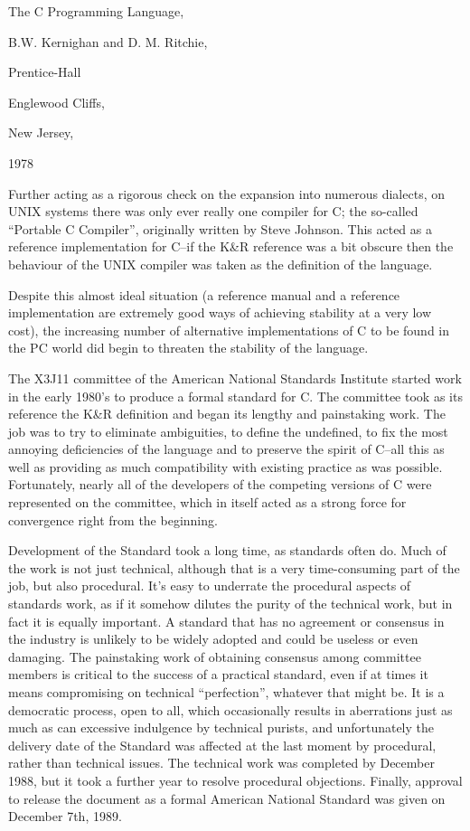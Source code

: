   

   The C Programming Language,

   B.W. Kernighan and D. M. Ritchie,

   Prentice-Hall

   Englewood Cliffs,

   New Jersey,

   1978

  


  Further acting as a rigorous check on the expansion into numerous
   dialects, on UNIX systems there was only ever really one compiler for C;
   the so-called ``Portable C Compiler'', originally written by
   Steve Johnson. This acted as a reference implementation for C--if
   the K\&R reference was a bit obscure then the behaviour of the UNIX
   compiler was taken as the definition of the language.


  Despite this almost ideal situation (a reference manual and a reference
   implementation are extremely good ways of achieving stability at a very low
   cost), the increasing number of alternative implementations of C to be
   found in the PC world did begin to threaten the stability of the
   language.


  The X3J11 committee of the American National Standards Institute started
   work in the early 1980's to produce a formal standard for C. The committee
   took as its reference the K\&R definition and began its lengthy and
   painstaking work. The job was to try to eliminate ambiguities, to define
   the undefined, to fix the most annoying deficiencies of the language and to
   preserve the spirit of C--all this as well as providing as much
   compatibility with existing practice as was possible. Fortunately, nearly
   all of the developers of the competing versions of C were represented on
   the committee, which in itself acted as a strong force for convergence
   right from the beginning.


  Development of the Standard took a long time, as standards often do. Much
   of the work is not just technical, although that is a very time-consuming
   part of the job, but also procedural. It's easy to underrate the procedural
   aspects of standards work, as if it somehow dilutes the purity of the
   technical work, but in fact it is equally important. A standard that has no
   agreement or consensus in the industry is unlikely to be widely adopted and
   could be useless or even damaging. The painstaking work of obtaining
   consensus among committee members is critical to the success of a practical
   standard, even if at times it means compromising on technical
   ``perfection'', whatever that might be. It is a democratic
   process, open to all, which occasionally results in aberrations just as
   much as can excessive indulgence by technical purists, and unfortunately
   the delivery date of the Standard was affected at the last moment by
   procedural, rather than technical issues. The technical work was completed
   by December 1988, but it took a further year to resolve procedural
   objections. Finally, approval to release the document as a formal American
   National Standard was given on December 7th, 1989.



